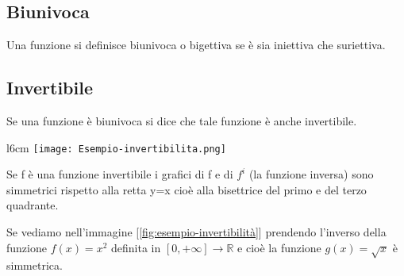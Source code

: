 \subsection{Biunivoca}
\begin{definition}[Biunivoca]
Una funzione si definisce biunivoca o bigettiva se è sia iniettiva che suriettiva.
\end{definition}

\subsection{Invertibile}
\begin{definition}[Invertibile]
Se una funzione è biunivoca si dice che tale funzione è anche invertibile.
\end{definition}
\begin{wrapfigure}{l}{6cm}
    \centering
    \texttt{[image: Esempio-invertibilita.png]}
    \caption{$f(x) = x^2$ e $g(x) = \sqrt{x}$}
    \label{fig:esempio-invertibilità}
\end{wrapfigure}
Se f è una funzione invertibile i grafici di f e di $f^i$ (la funzione inversa) sono simmetrici rispetto alla retta y=x cioè alla bisettrice del primo e del terzo quadrante. \\
\begin{example}
Se vediamo nell'immagine [\ref{fig:esempio-invertibilità}] prendendo l'inverso della funzione $f(x) = x^2$ definita in $[0, +\infty] \longrightarrow \mathbb{R}$ e cioè la funzione $g(x) = \sqrt{x}$ è simmetrica.
\\ \\ \\ \\ \\
\end{example}

